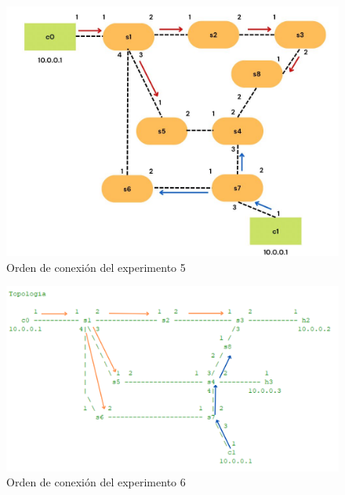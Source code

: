 \documentclass[a4paper, 12pt]{book}
\begin{document}
 	\begin{figure}[H]
 		\centering
 		\includegraphics[width=16cm, keepaspectratio]{img/escenario1_2c_4}
 		\caption{Orden de conexión del experimento 5}
 		\label{figura:escenario1_2c_4}
 	\end{figure}
 	
 	\begin{figure}[H]
 		\centering
 		\includegraphics[width=16cm, keepaspectratio]{img/escenario1_2c_5}
 		\caption{Orden de conexión del experimento 6}
 		\label{figura:escenario1_2c_5}
 	\end{figure}
 	
\end{document}
